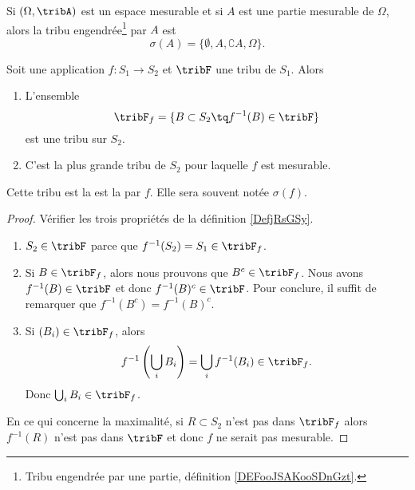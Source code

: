 \begin{lemma}       \label{LEMooCAUMooEdpjRs}
	Si \( (\Omega,\tribA)\) est un espace mesurable et si \( A\) est une partie mesurable de \( \Omega\), alors la tribu engendrée\footnote{Tribu engendrée par une partie, définition \ref{DEFooJSAKooSDnGzt}.} par \( A\) est
	\begin{equation}
		\sigma(A)=\{ \emptyset,A,\complement A,\Omega \}.
	\end{equation}
\end{lemma}

\begin{lemmaDef}        \label{DefNOJWooLGKhmJ}
	Soit une application \( f\colon S_1\to S_2\) et \( \tribF\) une tribu de \( S_1\). Alors
	\begin{enumerate}
		\item
		      L'ensemble
		      \begin{equation}
			      \tribF_f=\{  B\subset S_2\tq f^{-1}(B)\in \tribF  \}
		      \end{equation}
		      est une tribu sur \( S_2\).
		\item
		      C'est la plus grande tribu de \( S_2\) pour laquelle \( f\) est mesurable.
	\end{enumerate}
	Cette tribu est la est la  par \( f\). Elle sera souvent notée \( \sigma(f)\).
\end{lemmaDef}

\begin{proof}
	Vérifier les trois propriétés de la définition \ref{DefjRsGSy}.
	\begin{enumerate}
		\item
		      \( S_2\in\tribF\) parce que \(f^{-1}(S_2)=S_1\in \tribF_f\).
		\item
		      Si \( B\in \tribF_f\), alors nous prouvons que \( B^c\in \tribF_f\). Nous avons \( f^{-1}(B)\in\tribF\) et donc \( f^{-1}(B)^c\in\tribF\). Pour conclure, il suffit de remarquer que \( f^{-1}(B^c)=f^{-1}(B)^c\).
		\item
		      Si \( (B_i)\in\tribF_f\), alors
		      \begin{equation}
			      f^{-1}\left( \bigcup_iB_i \right)=\bigcup_if^{-1}(B_i)\in \tribF_f.
		      \end{equation}
		      Donc \( \bigcup_iB_i\in\tribF_f\).
	\end{enumerate}
	En ce qui concerne la maximalité, si \( R\subset S_2\) n'est pas dans \( \tribF_f\) alors \( f^{-1}(R)\) n'est pas dans \( \tribF\) et donc \( f\) ne serait pas mesurable.
\end{proof}

